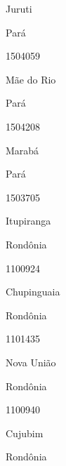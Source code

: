 \documentclass[
  letterpaper,
]{report}
\begin{document}
Juruti

\n    

\n    

\n      

Pará

\n      

1504059

\n      

Mãe do Rio

\n    

\n    

\n      

Pará

\n      

1504208

\n      

Marabá

\n    

\n    

\n      

Pará

\n      

1503705

\n      

Itupiranga

\n    

\n    

\n      

Rondônia

\n      

1100924

\n      

Chupinguaia

\n    

\n    

\n      

Rondônia

\n      

1101435

\n      

Nova União

\n    

\n    

\n      

Rondônia

\n      

1100940

\n      

Cujubim

\n    

\n    

\n      

Rondônia
\end{document}
